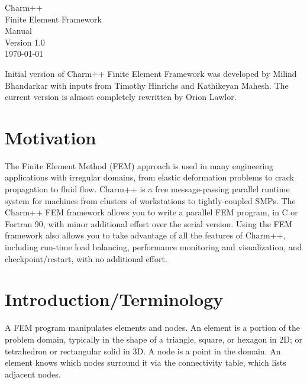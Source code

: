 \documentclass[11pt]{article}
\begin{document}
\begin{titlepage}
\vspace*{2in}
\Huge
\begin{center}
Charm++\\
Finite Element Framework\\
Manual\\
Version 1.0\\
\vspace*{0.7in}
\today
\end{center}
\normalsize

\vspace*{2.5in}\large

Initial version of Charm++ Finite Element Framework was developed
by Milind Bhandarkar with inputs from Timothy Hinrichs and Kathikeyan
Mahesh. The current version is almost completely rewritten by
Orion Lawlor.

\normalsize
\end{titlepage}

\tableofcontents
\newpage

\section{Motivation}

The Finite Element Method (FEM) approach is used in many engineering
applications with irregular domains, from elastic deformation problems to
crack propagation to fluid flow.  Charm++ is a free message-passing parallel
runtime system for machines from clusters of workstations to tightly-coupled
SMPs.  The Charm++ FEM framework allows you to write a parallel FEM program,
in C or Fortran 90, with minor additional effort over the serial version.
Using the FEM framework also allows you to take advantage of all the
features of Charm++, including run-time load balancing,  performance
monitoring and visualization, and checkpoint/restart, with no additional
effort.


\section{Introduction/Terminology}

A FEM program manipulates elements and nodes.  An element is a portion of
the problem domain, typically in the shape of a triangle, square, or hexagon
in 2D; or tetrahedron or rectangular solid in 3D.  A node is a point in the
domain.  An element knows which nodes surround it via the connectivity
table, which lists adjacent nodes.
\end{document}
